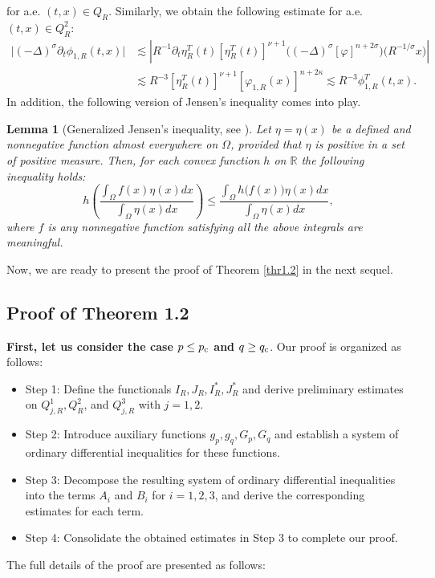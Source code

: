 \documentclass[11pt,reqno]{amsart}
\numberwithin{equation}{section}
\newtheorem{lemma}[theorem]{Lemma}
\begin{document}
for a.e. $(t,x)\in Q_R$. Similarly, we obtain the following estimate for a.e. $(t,x)\in Q^2_R$:
\begin{align}
\big|(-\Delta)^{\sigma}\partial_t\phi_{1,R}(t,x)\big| &\lesssim \left|R^{-1}\partial_t\eta^{T}_R(t)[\eta^{T}_R(t)]^{\nu+1}\big((-\Delta)^{\sigma}[\varphi]^{n+2\sigma}\big)\big(R^{-1/\sigma}x\big)\right|\nonumber\\
&\lesssim R^{-3}[\eta^{T}_R(t)]^{\nu+1}[\varphi_{1,R}(x)]^{n+2\kappa}\lesssim R^{-3}\phi^{T}_{1,R}(t,x).\label{testfunceq4}
\end{align}
In addition, the following version of Jensen's inequality comes into play.
\begin{lemma}[Generalized Jensen's inequality, see \cite{EbeGirRei2020}] \label{Jenseninequality}
Let $\eta=\eta(x)$ be a defined and nonnegative function almost everywhere on $\Omega$, provided that $\eta$ is positive in a set of positive measure. Then, for each convex function $h$ on $\mathbb{R}$ the following inequality holds:
$$
h\left(\frac{\int_{\Omega} f(x) \eta(x) d x}{\int_{\Omega} \eta(x) d x}\right) \leq \frac{\int_{\Omega} h\big(f(x)\big)\eta(x) d x}{\int_{\Omega} \eta(x) d x},
$$
where $f$ is any nonnegative function satisfying all the above integrals are meaningful.
\end{lemma}

Now, we are ready to present the proof of Theorem \ref{thr1.2} in the next sequel.
\subsection{Proof of Theorem 1.2}\label{subsec4.2}

{\bf First, let us consider the case $p\leq p_{\rm c}$ and $q\geq q_{\rm c}$}. Our proof is organized as follows:
\begin{itemize}
\item Step 1: Define the functionals $I_R, J_R, I^*_R, J^*_R$ and derive preliminary estimates on $Q^1_{j,R}, Q^2_{R}$, and $Q^3_{j,R}$ with $j=1,2$.
\item Step 2: Introduce auxiliary functions $g_p, g_q, G_p, G_q$ and establish a system of ordinary differential inequalities for these functions.
\item Step 3: Decompose the resulting system of ordinary differential inequalities into the terms $A_i$ and $B_i$ for $i=1,2,3$, and derive the corresponding estimates for each term.
\item Step 4: Consolidate the obtained estimates in Step 3 to complete our proof.
\end{itemize}
The full details of the proof are presented as follows:
\end{document}
